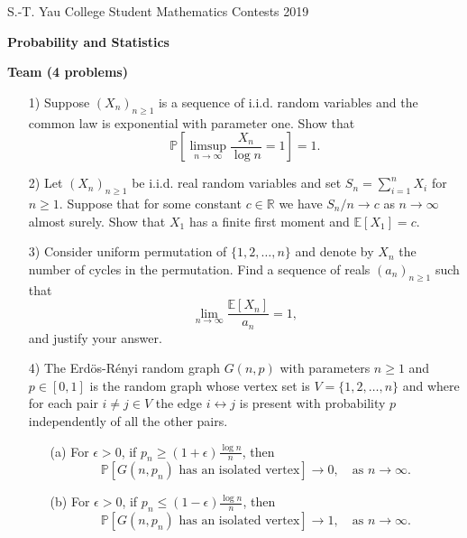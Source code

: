 \documentclass[10pt]{article}
\begin{document}
\begin{center}
S.-T. Yau College Student Mathematics Contests 2019\\

\vspace{0.1cm}

\Large {\bf Probability and Statistics}

\vspace{0.1cm}

\large {\bf Team (4 problems)}

\vspace{0.1cm}


\end{center}

\begin{enumerate}
\item[1)] Suppose $(X_n)_{n\ge 1}$ is a sequence of i.i.d. random variables and the common law is exponential with parameter one. Show that
\[\mathbb{P}\left[\limsup_{n\to\infty}\frac{X_n}{\log n}=1\right]=1.\]

\item[2)] Let $(X_n)_{n\ge 1}$ be i.i.d. real random variables and set $S_n=\sum_{i=1}^n X_i$ for $n\ge 1$. Suppose that for some constant $c\in\mathbb{R}$ we have
$S_n/n\to c$ as $n\to\infty$ almost surely.
Show that $X_1$ has a finite first moment and $\mathbb{E}[X_1]=c$.

\item[3)]Consider uniform permutation of $\{1, 2, \ldots, n\}$ and denote by $X_n$ the number of cycles in the permutation. Find a sequence of reals $(a_n)_{n\ge 1}$ such that
\[\lim_{n\to\infty}\frac{\mathbb{E}[X_n]}{a_n}=1,\]
and justify your answer.
\item[4)]The Erd\"{o}s-R\'{e}nyi random graph $G(n, p)$ with parameters $n\ge 1$ and $p\in [0,1]$ is the random graph whose vertex set is $V=\{1, 2, \ldots, n\}$ and where for each pair $i\neq j\in V$ the edge $i\leftrightarrow j$ is present with probability $p$ independently of all the other pairs.
\begin{enumerate}
\item[(a)] For $\epsilon>0$, if $p_n\ge (1+\epsilon)\frac{\log n}{n}$, then
\[\mathbb{P}[G(n, p_n) \text{ has an isolated vertex}]\to 0,\quad \text{as }n\to\infty.\]
\item[(b)] For $\epsilon>0$, if $p_n\le (1-\epsilon)\frac{\log n}{n}$, then
\[\mathbb{P}[G(n, p_n) \text{ has an isolated vertex}]\to 1,\quad \text{as }n\to\infty.\]
\end{enumerate}



\end{enumerate}
\end{document}
